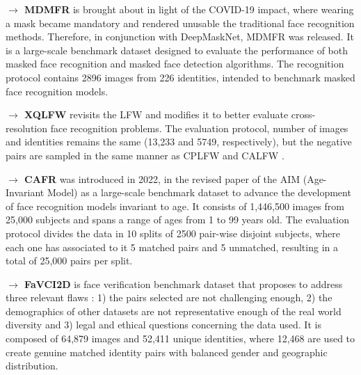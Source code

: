 \documentclass[class=report, crop=false, a4paper, 12pt]{standalone}
\begin{document}
\vspace{0.7\baselineskip}
\noindent\textbf{$\rightarrow$ MDMFR} \autocite{ullahNovelDeepMaskNetModel2022} is brought about in light of the COVID-19 impact, where wearing a mask became mandatory and rendered unusable the traditional face recognition methods. Therefore, in conjunction with DeepMaskNet, MDMFR was released. It is a large-scale benchmark dataset designed to evaluate the performance of both masked face recognition and masked face detection algorithms. The recognition protocol contains 2896 images from 226 identities, intended to benchmark masked face recognition models.

\vspace{0.7\baselineskip}
\noindent\textbf{$\rightarrow$ XQLFW} \autocite{knocheCrossQualityLFWDatabase2021} revisits the LFW and modifies it to better evaluate cross-resolution face recognition problems. The evaluation protocol, number of images and identities remains the same (13,233 and 5749, respectively), but the negative pairs are sampled in the same manner as CPLFW \autocite{zhengCrossPoseLFWDatabase} and CALFW \autocite{zhengCrossAgeLFWDatabase2017}.

\vspace{0.7\baselineskip}
\noindent\textbf{$\rightarrow$ CAFR} \autocite{zhaoAgeInvariantFaceRecognition2022} was introduced in 2022, in the revised paper of the AIM (Age-Invariant Model) as a large-scale benchmark dataset to advance the development of face recognition models invariant to age. It consists of 1,446,500 images from 25,000 subjects and spans a range of ages from 1 to 99 years old. The evaluation protocol divides the data in 10 splits of 2500 pair-wise disjoint subjects, where each one has associated to it 5 matched pairs and 5 unmatched, resulting in a total of 25,000 pairs per split.

\vspace{0.7\baselineskip}
\noindent\textbf{$\rightarrow$ FaVCI2D} \autocite{popescuFaceVerificationChallenging2022} is face verification benchmark dataset that proposes to address three relevant flaws : 1) the pairs selected are not challenging enough,  2) the demographics of other datasets are not representative enough of the real world diversity and 3) legal and ethical questions concerning the data used. It is composed of 64,879 images and 52,411 unique identities, where 12,468 are used to create genuine matched identity pairs with balanced gender and geographic distribution.
\end{document}
